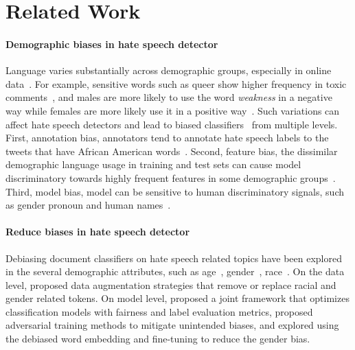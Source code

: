 \section{Related Work}

\paragraph{Demographic biases in hate speech detector}
Language varies substantially across demographic groups, especially in online data~\cite{goel2016social, hinds2018demographic}. For example, sensitive words such as queer show higher frequency in toxic comments~\cite{dixon2018measuring}, and males are more likely to use the word \textit{weakness} in a negative way while females are more likely use it in a positive way~\cite{volkova2013exploring}. Such variations can affect hate speech detectors and lead to biased classifiers~\cite{sap2019risk, shah2020predictive} from multiple levels. First, annotation bias, annotators tend to annotate hate speech labels to the tweets that have African American words~\cite{sap2019risk}. Second, feature bias, the dissimilar demographic language usage in training and test sets can cause model discriminatory towards highly frequent features in some demographic groups~\cite{davidson2019racial}. Third, model bias, model can be sensitive to human discriminatory signals, such as gender pronoun and human names~\cite{kiritchenko2018examining}. 



\paragraph{Reduce biases in hate speech detector}
Debiasing document classifiers on hate speech related topics have been explored in the several demographic attributes, such as age~\cite{diaz2018addressing, gencoglu2020cyberbullying}, gender~\cite{dixon2018measuring, park2018reducing}, race~\cite{davidson2019racial, xia2020demoting}.
On the data level, \cite{dixon2018measuring, davidson2019racial} proposed data augmentation strategies that remove or replace racial and gender related tokens.
On model level, \cite{gencoglu2020cyberbullying} proposed a joint framework that optimizes classification models with fairness and label evaluation metrics, \cite{zhang2018mitigating, xia2020demoting} proposed adversarial training methods to mitigate unintended biases, and \cite{park2018reducing} explored using the debiased word embedding and fine-tuning to reduce the gender bias.


